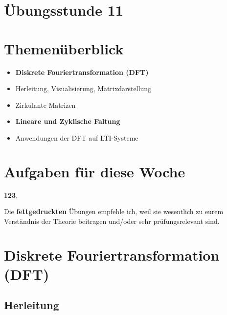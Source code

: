 \documentclass[11pt]{article}
\begin{document}
\thispagestyle{firstpage}

\setlength{\headheight}{1 \baselineskip}  %
\setlength{\parindent}{0pt}  %
\setlength{\parskip}{\baselineskip}  %

\vspace*{-5px}
\section*{Übungsstunde 11}

\section*{Themenüberblick}
\begin{itemize}
    \item \textbf{Diskrete Fouriertransformation (DFT)}
    \item[] Herleitung, Visualisierung, Matrixdarstellung
    \item[] Zirkulante Matrizen
    \item \textbf{Lineare und Zyklische Faltung}
    \item[] Anwendungen der DFT auf LTI-Systeme
\end{itemize}

\section*{Aufgaben für diese Woche}
\vspace{-0.5cm}

\textbf{123}, \\
\vspace{-0.5cm}

Die \textbf{fettgedruckten} Übungen empfehle ich, weil sie wesentlich zu eurem Verständnis der Theorie beitragen und/oder sehr prüfungsrelevant sind.

\vfill \null
\pagebreak

\section*{Diskrete Fouriertransformation (DFT)}
\vspace*{-0.5cm}
\subsection*{Herleitung}
\vspace*{-0.5cm}
\end{document}
